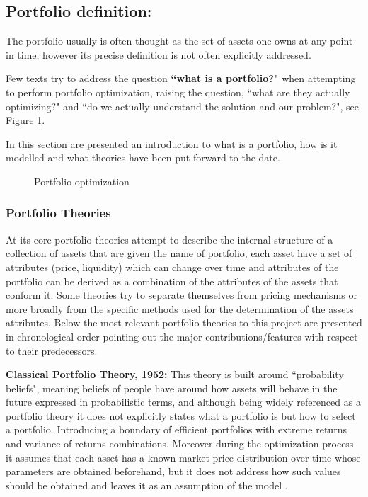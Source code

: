 \subsection{Portfolio definition:}
The portfolio usually is often thought as the set of assets one owns at any point in time, however its precise definition is not often explicitly addressed.

Few texts try to address the question \textbf{``what is a portfolio?"} when attempting to perform portfolio optimization, raising the question, ``what are they actually optimizing?" and ``do we actually understand the solution and our problem?", see Figure \ref{fig::what_is_a_portfolio}. 

In this section are presented an introduction to what is a portfolio, how is it modelled and what theories have been put forward to the date.

\begin{figure}[!ht]
    \centering
    
    \caption[Portfolio optimization]{Portfolio optimization}
    \label{fig::what_is_a_portfolio}
\end{figure}


\subsubsection{Portfolio Theories} \label{sec::2_portfolio_theories}
At its core portfolio theories attempt to describe the internal structure of a collection of assets that are given the name of portfolio, each asset have a set of attributes (price, liquidity) which can change over time and attributes of the portfolio can be derived as a combination of the attributes of the assets that conform it. Some theories try to separate themselves from pricing mechanisms or more broadly from the specific methods used for the determination of the assets attributes. Below the most relevant portfolio theories to this project are presented in chronological order pointing out the major contributions/features with respect to their predecessors.

\textbf{Classical Portfolio Theory, 1952:} This theory is built around ``probability beliefs", meaning beliefs of people have around how assets will behave in the future expressed in probabilistic terms, and although being widely referenced as a portfolio theory it does not explicitly states what a portfolio is but how to select a portfolio. Introducing a boundary of efficient portfolios with extreme returns and variance of returns combinations. Moreover during the optimization process it assumes that each asset has a known market price distribution over time whose parameters are obtained beforehand, but it does not address how such values should be obtained and leaves it as an assumption of the model \cite{classical_portfolio_theory}.

